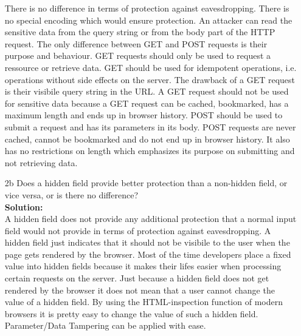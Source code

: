 \documentclass[a4paper]{article}
\begin{document}
\begin{enumerate}
	There is no difference in terms of protection against eavesdropping. There is no special encoding which would ensure protection. An attacker can read the sensitive data from the query string or from the body part of the HTTP request. The only difference between GET and POST requests is their purpose and behaviour. GET requests should only be used to request a ressource or retrieve data. GET should be used for idempotent operations, i.e. operations without side effects on the server. The drawback of a GET request is their visibile query string in the URL. A GET request should not be used for sensitive data because a GET request can be cached, bookmarked, has a maximum length and ends up in browser history. POST should be used to submit a request and has its parameters in its body. POST requests are never cached, cannot be bookmarked and do not end up in browser history. It also has no restrictions on length which emphasizes its purpose on submitting and not retrieving data.\\	
	
	
	
	\item[2b] Does a hidden field provide better protection than a non-hidden field, or vice versa, or is there no difference?\\
	\textbf{Solution:}\\
		
	A hidden field does not provide any additional protection that a normal input field would not provide in terms of protection against eavesdropping. A hidden field just indicates that it should not be visibile to the user when the page gets rendered by the browser. Most of the time developers place a fixed value into hidden fields because it makes their lifes easier when processing certain requests on the server. Just because a hidden field does not get rendered by the browser it does not mean that a user cannot change the value of a hidden field. By using the HTML-inspection function of modern browsers it is pretty easy to change the value of such a hidden field. Parameter/Data Tampering can be applied with ease.	
	
\end{enumerate}
\end{document}
